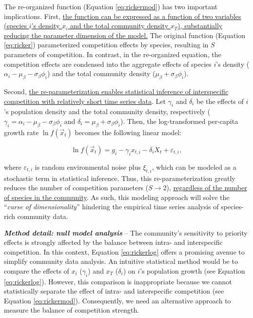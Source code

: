 \documentclass[12pt, class=article, crop=false]{standalone}
\begin{document}
The re-organized function (Equation \ref{eq:rickermod}) has two important implications.
First, \ul{the function can be expressed as a function of two variables (species $i$'s density $x_i$ and the total community density $x_T$), substantially reducing the parameter dimension of the model.}
The original function (Equation \ref{eq:ricker}) parameterized competition effects by species, resulting in $S$ parameters of competition.
In contrast, in the re-organized equation, the competition effects are condensed into the aggregate effects of species $i$'s density ($\alpha_i - \mu_{\beta} - \sigma_{\beta} \phi_i$) and the total community density ($\mu_{\beta} + \sigma_{\beta} \phi_i$).

Second, \ul{the re-parameterization enables statistical inference of interspecific competition with relatively short time series data}.
Let $\gamma_i$ and $\delta_i$ be the effects of $i$'s population density and the total community density, respectively ($\gamma_i = \alpha_i - \mu_{\beta} - \sigma_{\beta} \phi_i$ and $\delta_i = \mu_{\beta} + \sigma_{\beta} \phi_i$).
Then, the log-transformed per-capita growth rate $\ln f(\overset{\rightarrow}{x}_{t})$ becomes the following linear model:

\begin{equation}
\label{eq:rickerlog}
    \ln f(\overset{\rightarrow}{x}_{t}) = g_i - \gamma_i x_{t,i} - \delta_i X_t + \varepsilon_{t,i},
\end{equation}

where $\varepsilon_{t,i}$ is random environmental noise plus $\xi_{t,i}$, which can be modeled as a stochastic term in statistical inference. Thus, this re-parameterization greatly reduces the number of competition parameters ($S \rightarrow 2$), \ul{regardless of the number of species in the community}.
As such, this modeling approach will solve the ``\textit{curse of dimensionality}'' hindering the empirical time series analysis of species-rich community data.

\textbf{\textit{Method detail: null model analysis}} --
The community's sensitivity to priority effects is strongly affected by the balance between intra- and interspecific competition.
In this context, Equation \ref{eq:rickerlog} offers a promising avenue to simplify community data analysis. 
An intuitive statistical method would be to compare the effects of $x_i$ ($\gamma_i$) and $x_T$ ($\delta_i$) on $i$'s population growth (see Equation \ref{eq:rickerlog}).
However, this comparison is inappropriate because we cannot statistically separate the effect of intra- and interspecific competition (see Equation \ref{eq:rickermod}).
Consequently, we need an alternative approach to measure the balance of competition strength.
\end{document}

